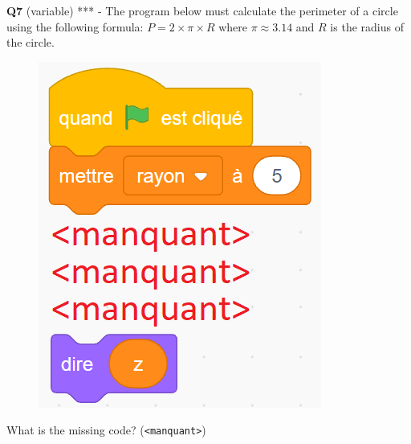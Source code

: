 \documentclass[14pt]{extarticle}
\begin{document}
\newpage
\textbf{Q7} (variable) *** - The program below must calculate the perimeter of a circle using the following formula:
$P = 2 \times \pi \times R $ where $\pi \approx 3.14$ and $R$ is the radius of the circle.
\begin{figure}[H]
    \centering
    \includegraphics[width=0.4\linewidth]{images/pretest/_Q7.png}
\end{figure}
What is the missing code? (\texttt{<manquant>})
\end{document}
